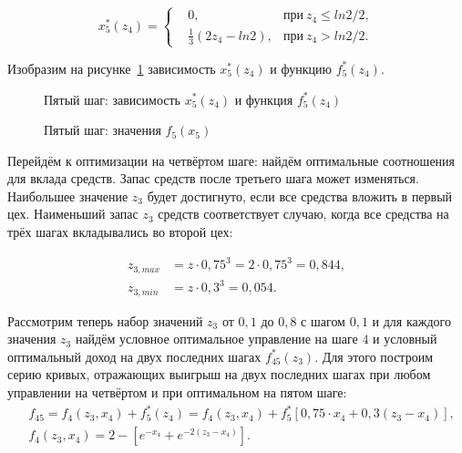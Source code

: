 \begin{equation}
  x_5^*(z_4) = 
  \left\{
    \begin{aligned}
      &0, & \text{при} ~z_4 \le ln2/2, \\
      &\frac{1}{3}(2z_4 - ln2), & \text{при} ~z_4 > ln2/2. 
    \end{aligned}
  \right.
\end{equation}

Изобразим на рисунке~\ref{figure:opts_5} зависимость $x^*_5(z_4) $ и функцию $f^*_5(z_4) $.

\begin{figure}[h!]
  \caption{Пятый шаг: зависимость  $x^*_5(z_4)$ и функция $ f^*_5(z_4) $\label{figure:opts_5}}
\end{figure}

\begin{figure}[h!]
  \label{figure:family_5}
  \caption{Пятый шаг: значения $f_{5}(x_5)$}
\end{figure}

Перейдём к оптимизации на четвёртом шаге: найдём оптимальные соотношения для вклада средств. Запас средств после третьего шага может изменяться. Наибольшее значение $ z_3 $ будет достигнуто, если все средства вложить в первый цех. Наименьший запас $ z_3 $ средств соответствует случаю, когда все средства на трёх шагах вкладывались во второй цех:

\begin{equation}
  \begin{aligned}
    z_{3,max} &= z \cdot 0,75^3 = 2 \cdot 0,75^3 = 0,844, \\
    z_{3,min} &= z \cdot 0,3^3 = 0,054.  
  \end{aligned}
\end{equation}

Рассмотрим теперь набор значений $z_3$ от $0,1$ до $0,8$ с шагом $0,1$ и для каждого значения $z_3$ найдём условное оптимальное управление на шаге $4$ и условный оптимальный доход на двух последних шагах $ f^*_{45}(z_3) $. Для этого построим серию кривых, отражающих выигрыш на двух последних шагах при любом управлении на четвёртом и при оптимальном на пятом шаге:
\begin{equation}
  \begin{aligned}
    &f_{45} = f_4(z_3, x_4) + f^*_5(z_4) = f_4(z_3, x_4) + f^*_5[0,75 \cdot x_4 + 0,3 (z_3 - x_4)], \\
    &f_4(z_3, x_4) = 2 - [e^{-x_4} + e^{-2(z_3 - x_4)}].
  \end{aligned}
\end{equation}

